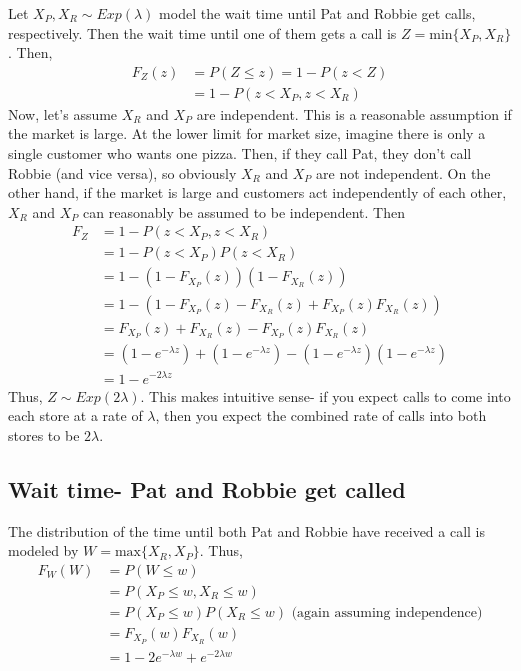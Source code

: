 \documentclass[paper=a4, fontsize=11pt]{scrartcl} %
\numberwithin{equation}{section} %
\numberwithin{figure}{section} %
\numberwithin{table}{section} %
\begin{document}
Let $X_P, X_R \sim Exp(\lambda)$ model the wait time until Pat and Robbie get calls, respectively. Then the wait time until one of them gets a call is $Z = \textrm{min}\{X_P, X_R\}$. Then,
\begin{align*}
F_Z(z) &= P(Z \leq z) = 1 - P(z < Z) \\
   &= 1 - P(z < X_P, z < X_R)
\end{align*}
Now, let's assume $X_R$ and $X_P$ are independent. This is a reasonable assumption if the market is large. At the lower limit for market size, imagine there is only a single customer who wants one pizza. Then, if they call Pat, they don't call Robbie (and vice versa), so obviously $X_R$ and $X_P$ are not independent. On the other hand, if the market is large and customers act independently of each other, $X_R$ and $X_P$ can reasonably be assumed to be independent. Then
\begin{align*}
F_Z &= 1 - P(z < X_P, z < X_R) \\
   &= 1- P(z < X_P)P(z < X_R)\\
   &= 1 - (1 - F_{X_P}(z))(1 - F_{X_R}(z))\\
   &= 1 - (1 - F_{X_P}(z)- F_{X_R}(z) + F_{X_P}(z)F_{X_R}(z))\\
   &= F_{X_P}(z) + F_{X_R}(z) - F_{X_P}(z)F_{X_R}(z)\\
   &= (1 - e^{-\lambda z}) + (1 - e^{-\lambda z}) - (1 - e^{-\lambda z})(1 - e^{-\lambda z})\\
   &= 1 - e^{-2\lambda z}
\end{align*}
Thus, $Z \sim Exp(2\lambda)$. This makes intuitive sense- if you expect calls to come into each store at a rate of $\lambda$, then you expect the combined rate of calls into both stores to be $2 \lambda$.

\subsection{Wait time- Pat and Robbie get called}

The distribution of the time until both Pat and Robbie have received a call is modeled by $W = \textrm{max}\{X_R, X_P\}$. Thus,
\begin{align*}
F_W(W) &= P(W \leq w)\\
   &= P(X_P \leq w, X_R \leq w)\\
   &= P(X_P \leq w)P(X_R \leq w) \textrm{   (again assuming independence)}\\
   &= F_{X_P}(w)F_{X_R}(w)\\
   &= 1 - 2 e^{-\lambda w} + e^{-2 \lambda w}
\end{align*}
\end{document}
